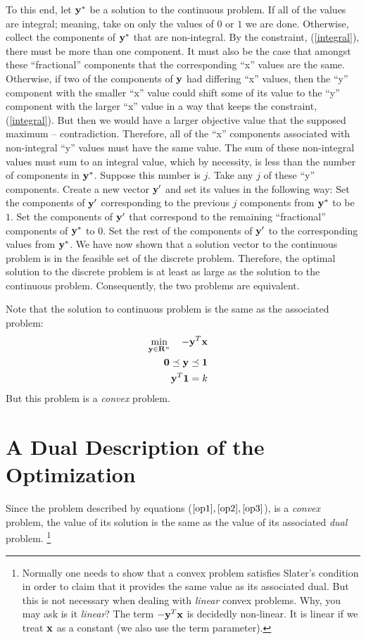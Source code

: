 \documentclass[12pt]{article}
\begin{document}
To this end, let ${\bf y}^*$ be a solution to the continuous problem. If all
of the values are integral; meaning, take on only the values of $0$ or $1$ we 
are done. Otherwise, collect the components of ${\bf y}^*$ that are non-integral.
By the constraint, (\ref{integral}), there must be more than one component. 
It must also be the case that amongst these ``fractional'' components that
the corresponding ``x'' values are the same. Otherwise, if two of the components 
of ${\bf y}$ had differing ``x'' values, then the ``y'' component with the 
smaller ``x'' value could shift some of its value to the ``y'' component with 
the larger ``x'' value in a way that keeps the constraint, (\ref{integral}). 
But then we would have a larger objective value that the supposed maximum 
-- contradiction. Therefore, all of the 
``x'' components associated with non-integral ``y'' values must have the same 
value. The sum of these non-integral values must sum to an integral value, which 
by necessity, is less than the number of components in ${\bf y}^*$. Suppose 
this number is $j$. Take any $j$ of these ``y'' components. Create a new 
vector ${\bf y}^\prime$ and set its values in the following way: Set the 
components of ${\bf y}^\prime$ corresponding to the previous $j$ components 
from ${\bf y}^*$ to be $1$. Set the components of ${\bf y}^\prime$ that 
correspond to the remaining ``fractional'' components of ${\bf y}^*$ to $0$. 
Set the rest of the components of ${\bf y}^\prime$ to the 
corresponding values from ${\bf y}^*$. We have now shown that a solution vector 
to the continuous problem is in the feasible set of the discrete problem. 
Therefore, the optimal solution to the discrete problem is at least as large as 
the solution to the continuous problem. Consequently, the two problems are 
equivalent.

Note that the solution to continuous problem is the same as the associated problem:
\begin{eqnarray}
	\mathop{\rm min}_{{\bf y} \in {\bf R}^n}\limits \quad -{\bf y}^T {\bf x} && \label{op1} \\ 
	{\bf 0} \preceq {\bf y} \preceq {\bf 1} &&  \label{op2}\\
	{\bf y}^T {\bf 1} =  k \label{op3} &&
\end{eqnarray}
But this problem is a {\it convex\/} problem.

\section{A Dual Description of the Optimization}
Since the problem described by equations ($\ref{op1}, \ref{op2}, \ref{op3}$), is
a {\it convex\/} problem, the value of its solution is the same as the value of 
its associated {\it dual\/} problem.%
\footnote{Normally one needs to show that a convex problem satisfies Slater's condition
	in order to claim that it provides the same value as its associated dual.
But this is not necessary when dealing with {\it linear\/} convex problems. 
Why, you may ask is it {\it linear\/}? The term $-{\bf y}^T {\bf x}$ is
decidedly non-linear. It is linear if we treat ${\bf x}$ as a constant (we also
use the term parameter).}
\end{document}
